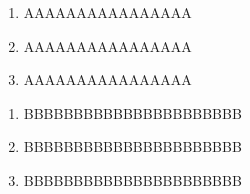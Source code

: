 \begin{publications}
  

  \begin{enumerate}
  \item AAAAAAAAAAAAAAAA
  \item AAAAAAAAAAAAAAAA
  \item AAAAAAAAAAAAAAAA    
  \end{enumerate}


  \begin{enumerate}
  \item BBBBBBBBBBBBBBBBBBBBBB
  \item BBBBBBBBBBBBBBBBBBBBBB
  \item BBBBBBBBBBBBBBBBBBBBBB    
  \end{enumerate}
  
\end{publications}
